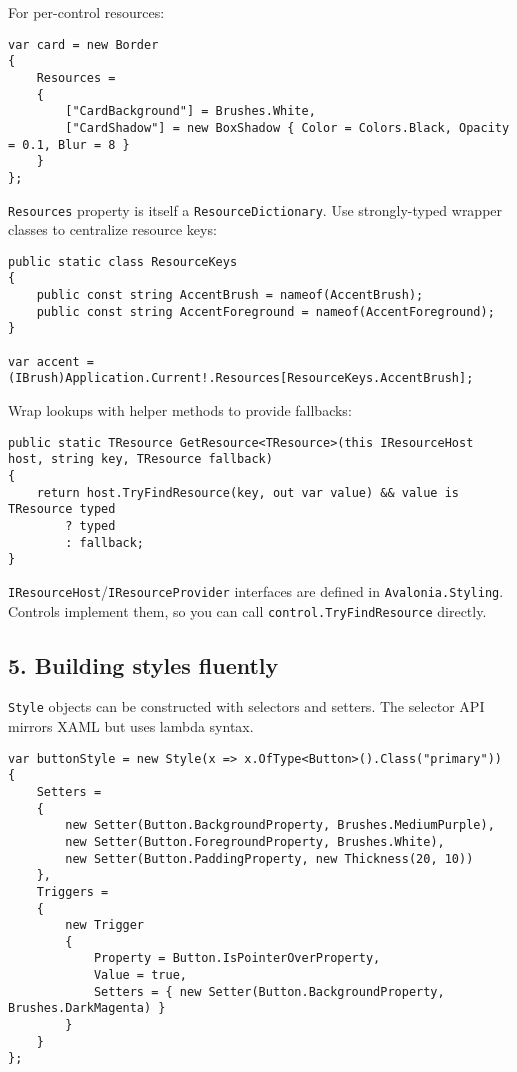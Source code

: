 For per-control resources:

\begin{lstlisting}
var card = new Border
{
    Resources =
    {
        ["CardBackground"] = Brushes.White,
        ["CardShadow"] = new BoxShadow { Color = Colors.Black, Opacity = 0.1, Blur = 8 }
    }
};
\end{lstlisting}

\passthrough{\lstinline!Resources!} property is itself a
\passthrough{\lstinline!ResourceDictionary!}. Use strongly-typed wrapper
classes to centralize resource keys:

\begin{lstlisting}
public static class ResourceKeys
{
    public const string AccentBrush = nameof(AccentBrush);
    public const string AccentForeground = nameof(AccentForeground);
}

var accent = (IBrush)Application.Current!.Resources[ResourceKeys.AccentBrush];
\end{lstlisting}

Wrap lookups with helper methods to provide fallbacks:

\begin{lstlisting}
public static TResource GetResource<TResource>(this IResourceHost host, string key, TResource fallback)
{
    return host.TryFindResource(key, out var value) && value is TResource typed
        ? typed
        : fallback;
}
\end{lstlisting}

\passthrough{\lstinline!IResourceHost!}/\passthrough{\lstinline!IResourceProvider!}
interfaces are defined in \passthrough{\lstinline!Avalonia.Styling!}.
Controls implement them, so you can call
\passthrough{\lstinline!control.TryFindResource!} directly.

\subsection{5. Building styles fluently}\label{building-styles-fluently}

\passthrough{\lstinline!Style!} objects can be constructed with
selectors and setters. The selector API mirrors XAML but uses lambda
syntax.

\begin{lstlisting}
var buttonStyle = new Style(x => x.OfType<Button>().Class("primary"))
{
    Setters =
    {
        new Setter(Button.BackgroundProperty, Brushes.MediumPurple),
        new Setter(Button.ForegroundProperty, Brushes.White),
        new Setter(Button.PaddingProperty, new Thickness(20, 10))
    },
    Triggers =
    {
        new Trigger
        {
            Property = Button.IsPointerOverProperty,
            Value = true,
            Setters = { new Setter(Button.BackgroundProperty, Brushes.DarkMagenta) }
        }
    }
};
\end{lstlisting}

